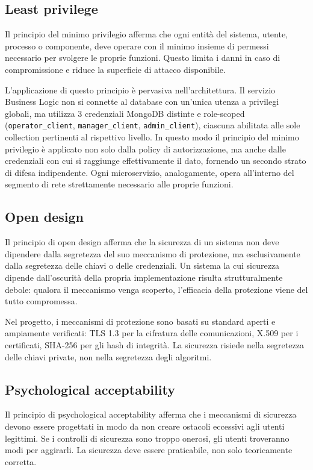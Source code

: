 \subsection{Least privilege}

Il principio del minimo privilegio afferma che ogni entità del sistema, utente, processo o componente, deve operare con il minimo insieme di permessi necessario per svolgere le proprie funzioni. Questo limita i danni in caso di compromissione e riduce la superficie di attacco disponibile.

L'applicazione di questo principio è pervasiva nell'architettura. Il servizio Business Logic non si connette al database con un'unica utenza a privilegi globali, ma utilizza 3 credenziali MongoDB distinte e role-scoped (\texttt{operator\_client}, \texttt{manager\_client}, \texttt{admin\_client}), ciascuna abilitata alle sole collection pertinenti al rispettivo livello. In questo modo il principio del minimo privilegio è applicato non solo dalla policy di autorizzazione, ma anche dalle credenziali con cui si raggiunge effettivamente il dato, fornendo un secondo strato di difesa indipendente. Ogni microservizio, analogamente, opera all'interno del segmento di rete strettamente necessario alle proprie funzioni.

\subsection{Open design}

Il principio di open design afferma che la sicurezza di un sistema non deve dipendere dalla segretezza del suo meccanismo di protezione, ma esclusivamente dalla segretezza delle chiavi o delle credenziali. Un sistema la cui sicurezza dipende dall'oscurità della propria implementazione risulta strutturalmente debole: qualora il meccanismo venga scoperto, l'efficacia della protezione viene del tutto compromessa.

Nel progetto, i meccanismi di protezione sono basati su standard aperti e ampiamente verificati: TLS 1.3 per la cifratura delle comunicazioni, X.509 per i certificati, SHA-256 per gli hash di integrità. La sicurezza risiede nella segretezza delle chiavi private, non nella segretezza degli algoritmi.

\subsection{Psychological acceptability}

Il principio di psychological acceptability afferma che i meccanismi di sicurezza devono essere progettati in modo da non creare ostacoli eccessivi agli utenti legittimi. Se i controlli di sicurezza sono troppo onerosi, gli utenti troveranno modi per aggirarli. La sicurezza deve essere praticabile, non solo teoricamente corretta.

